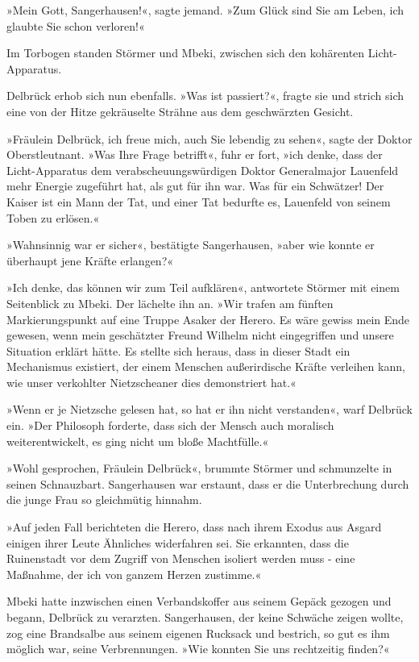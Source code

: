 »Mein Gott, Sangerhausen!«, sagte jemand. »Zum Glück sind Sie am
Leben, ich glaubte Sie schon verloren!«

Im Torbogen standen Störmer und Mbeki, zwischen sich den kohärenten
Licht-Apparatus.

Delbrück erhob sich nun ebenfalls. »Was ist passiert?«, fragte sie
und strich sich eine von der Hitze gekräuselte Strähne aus dem
geschwärzten Gesicht.

»Fräulein Delbrück, ich freue mich, auch Sie lebendig zu sehen«,
sagte der Doktor Oberstleutnant. »Was Ihre Frage betrifft«, fuhr er
fort, »ich denke, dass der Licht-Apparatus dem
verabscheuungswürdigen Doktor Generalmajor Lauenfeld mehr Energie
zugeführt hat, als gut für ihn war. Was für ein Schwätzer! Der
Kaiser ist ein Mann der Tat, und einer Tat bedurfte es, Lauenfeld
von seinem Toben zu erlösen.«

»Wahnsinnig war er sicher«, bestätigte Sangerhausen, »aber wie
konnte er überhaupt jene Kräfte erlangen?«

»Ich denke, das können wir zum Teil aufklären«, antwortete Störmer
mit einem Seitenblick zu Mbeki. Der lächelte ihn an. »Wir trafen am
fünften Markierungspunkt auf eine Truppe Asaker der Herero. Es wäre
gewiss mein Ende gewesen, wenn mein geschätzter Freund Wilhelm
nicht eingegriffen und unsere Situation erklärt hätte. Es stellte
sich heraus, dass in dieser Stadt ein Mechanismus existiert, der
einem Menschen außerirdische Kräfte verleihen kann, wie unser
verkohlter Nietzscheaner dies demonstriert hat.«

»Wenn er je Nietzsche gelesen hat, so hat er ihn nicht verstanden«,
warf Delbrück ein. »Der Philosoph forderte, dass sich der Mensch
auch moralisch weiterentwickelt, es ging nicht um bloße
Machtfülle.«

»Wohl gesprochen, Fräulein Delbrück«, brummte Störmer und
schmunzelte in seinen Schnauzbart. Sangerhausen war erstaunt, dass
er die Unterbrechung durch die junge Frau so gleichmütig hinnahm.

»Auf jeden Fall berichteten die Herero, dass nach ihrem Exodus aus
Asgard einigen ihrer Leute Ähnliches widerfahren sei. Sie
erkannten, dass die Ruinenstadt vor dem Zugriff von Menschen
isoliert werden muss - eine Maßnahme, der ich von ganzem Herzen
zustimme.«

Mbeki hatte inzwischen einen Verbandskoffer aus seinem Gepäck
gezogen und begann, Delbrück zu verarzten. Sangerhausen, der keine
Schwäche zeigen wollte, zog eine Brandsalbe aus seinem eigenen
Rucksack und bestrich, so gut es ihm möglich war, seine
Verbrennungen. »Wie konnten Sie uns rechtzeitig finden?«

